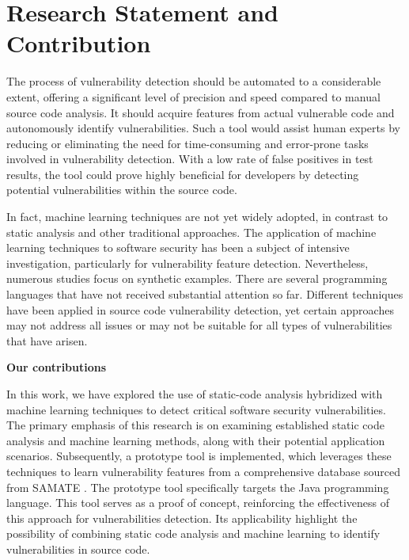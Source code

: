 \section{Research Statement and Contribution} %
\label{sec:research_statement}

The process of vulnerability detection should be automated to a considerable extent, offering a significant level of precision and speed compared to manual source code analysis. It should acquire features from actual vulnerable code and autonomously identify vulnerabilities. Such a tool would assist human experts by reducing or eliminating the need for time-consuming and error-prone tasks involved in vulnerability detection. With a low rate of false positives in test results, the tool could prove highly beneficial for developers by detecting potential vulnerabilities within the source code.
	
In fact, machine learning techniques are not yet widely adopted, in contrast to static analysis and other traditional approaches. The application of machine learning techniques to software security has been a subject of intensive investigation, particularly for vulnerability feature detection. Nevertheless, numerous studies focus on synthetic examples. There are several programming languages that have not received substantial attention so far. Different techniques have been applied in source code vulnerability detection, yet certain approaches may not address all issues or may not be suitable for all types of vulnerabilities that have arisen.

{\Large \textbf{Our contributions}}

In this work, we have explored the use of static-code analysis hybridized with machine learning techniques to detect critical software security vulnerabilities. The primary emphasis of this research is on examining established static code analysis and machine learning methods, along with their potential application scenarios. Subsequently, a prototype tool is implemented, which leverages these techniques to learn vulnerability features from a comprehensive database sourced from SAMATE \cite{SAMATE2023}. The prototype tool specifically targets the Java programming language. This tool serves as a proof of concept, reinforcing the effectiveness of this approach for vulnerabilities detection. Its applicability highlight the possibility of combining static code analysis and machine learning to identify vulnerabilities in source code.
